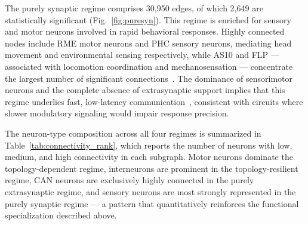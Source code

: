\documentclass[prx,superscriptaddres, twocolumn]{revtex4-2}
\begin{document}
The purely synaptic regime comprises 30,950 edges, of which 2,649 are statistically
significant (Fig.~\ref{fig:puresyn}). This regime is enriched for sensory and motor
neurons involved in rapid behavioral responses. Highly connected nodes include RME motor
neurons and PHC sensory neurons, mediating head movement and environmental sensing
respectively, while AS10 and FLP --- associated with locomotion coordination and
mechanosensation --- concentrate the largest number of significant
connections~\cite{wormatlas2023,bhattacharya2019plasticity,altun2009high,
wang2024neurotransmitter,pereira2015cellular,tolstenkov2018functionally,kaplan1993}.
The dominance of sensorimotor neurons and the complete absence of extrasynaptic support
implies that this regime underlies fast, low-latency
communication~\cite{bentley2016multilayer,chatzigeorgiou2010specific}, consistent with
circuits where slower modulatory signaling would impair response precision.

The neuron-type composition across all four regimes is summarized in
Table~\ref{tab:connectivity_rank}, which reports the number of neurons with low, medium,
and high connectivity in each subgraph. Motor neurons dominate the topology-dependent
regime, interneurons are prominent in the topology-resilient regime, CAN neurons are
exclusively highly connected in the purely extrasynaptic regime, and sensory neurons are
most strongly represented in the purely synaptic regime --- a pattern that quantitatively
reinforces the functional specialization described above.
\end{document}
